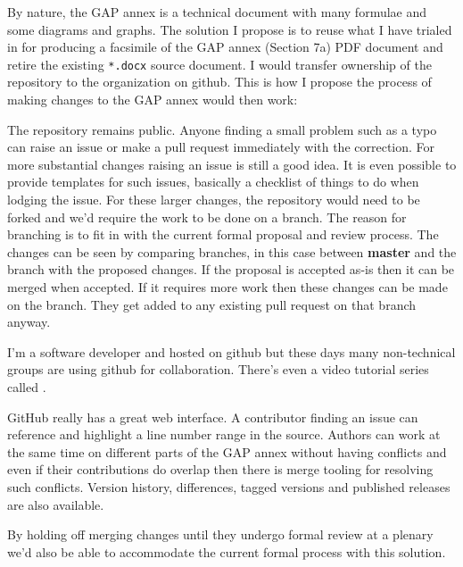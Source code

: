 \documentclass{article}
\begin{document}
By nature, the GAP annex is a technical document with many formulae and some
diagrams and graphs. The solution I propose is to reuse what I have trialed in
for producing a facsimile of the GAP annex (Section 7a) PDF document and retire
the existing \texttt{*.docx} source document. I would transfer ownership of the
 repository to the
 organization on github. This is
how I propose the process of making changes to the GAP annex would then work:

The repository remains public. Anyone finding a small problem such as a typo
can raise an issue or make a pull request immediately with the correction. For
more substantial changes raising an issue is still a good idea. It is even
possible to provide templates for such issues, basically a checklist of things
to do when lodging the issue. For these larger changes, the repository would
need to be forked and we'd require the work to be done on a branch. The reason
for branching is to fit in with the current formal proposal and review process.
The changes can be seen by comparing branches, in this case between
\textbf{master} and the branch with the proposed changes. If the proposal is
accepted as-is then it can be merged when accepted. If it requires more work
then these changes can be made on the branch. They get added to any existing
pull request on that branch anyway.

I'm a software developer and  hosted on github but these days many non-technical groups are
using github for collaboration.  There's even a video tutorial series called
.

GitHub really has a great web interface. A contributor finding an issue can
reference and highlight a line number range in the source. Authors can work at
the same time on different parts of the GAP annex without having conflicts and
even if their contributions do overlap then there is merge tooling for
resolving such conflicts.  Version history, differences, tagged versions and
published releases are also available.

By holding off merging changes until they undergo formal review at a plenary
we'd also be able to accommodate the current formal process with this solution.
\end{document}
